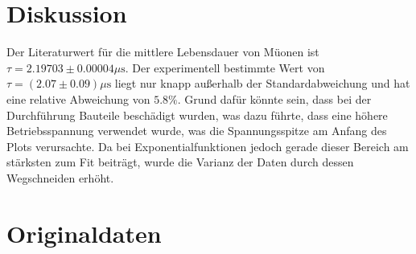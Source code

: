\section{Diskussion}
\label{sec:Diskussion}
Der Literaturwert für die mittlere Lebensdauer von Müonen ist $\tau = 2.19703 \pm 0.00004 \text{$\mu$s}$. \cite{myon_chemie_de} Der experimentell bestimmte Wert von $\tau = (2.07 \pm 0.09)\text{$\mu$s}$ liegt nur knapp außerhalb der Standardabweichung und hat eine relative Abweichung von $5.8\%$. Grund dafür könnte sein, dass bei der Durchführung Bauteile beschädigt wurden, was dazu führte, dass eine höhere Betriebsspannung verwendet wurde, was die Spannungsspitze am Anfang des Plots verursachte. Da bei Exponentialfunktionen jedoch gerade dieser Bereich am stärksten zum Fit beiträgt, wurde die Varianz der Daten durch dessen Wegschneiden erhöht.

\section{Originaldaten}



